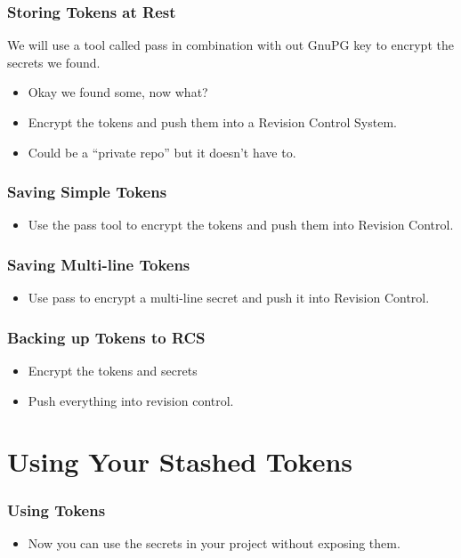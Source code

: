 \documentclass[aspectratio=169]{beamer}
\makeatletter
\def\sectionsubtitle#1{\gdef\@sectionsubtitle{#1}}
\gdef\@sectionsubtitle{}
\makeatother
\begin{document}
\begin{frame}
	\frametitle{Storing Tokens at Rest}
    We will use a tool called pass in combination with out GnuPG key to encrypt the secrets we found.
	\begin{itemize}
        \item Okay we found some, now what?
		\item Encrypt the tokens and push them into a Revision Control System.
        \item Could be a ``private repo'' but it doesn't have to.
	\end{itemize}
\end{frame}

\begin{frame}
	\frametitle{Saving Simple Tokens}
	\begin{itemize}
		\item Use the pass tool to encrypt the tokens and push them into Revision Control.
	\end{itemize}
\end{frame}

\begin{frame}
	\frametitle{Saving Multi-line Tokens}
	\begin{itemize}
		\item Use pass to encrypt a multi-line secret and push it into Revision Control.
	\end{itemize}
\end{frame}

\begin{frame}
	\frametitle{Backing up Tokens to RCS}
	\begin{itemize}
		\item Encrypt the tokens and secrets
		\item Push everything into revision control.
	\end{itemize}
\end{frame}

\sectionsubtitle{How to Use What You Built}
\section{Using Your Stashed Tokens}

\begin{frame}
	\frametitle{Using Tokens}
	\begin{itemize}
		\item Now you can use the secrets in your project without exposing them.
	\end{itemize}
\end{frame}
\end{document}
